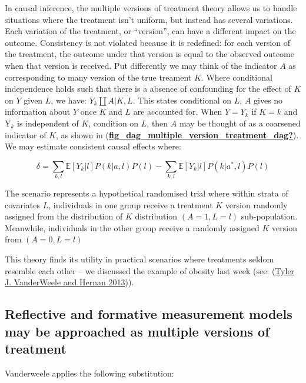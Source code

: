 \documentclass[
  singlecolumn]{report}
\begin{document}
In causal inference, the multiple versions of treatment theory allows us
to handle situations where the treatment isn't uniform, but instead has
several variations. Each variation of the treatment, or ``version'', can
have a different impact on the outcome. Consistency is not violated
because it is redefined: for each version of the treatment, the outcome
under that version is equal to the observed outcome when that version is
received. Put differently we may think of the indicator \(A\) as
corresponding to many version of the true treament \(K\). Where
conditional independence holds such that there is a absence of
confounding for the effect of \(K\) on \(Y\) given \(L\), we have:
\(Y_k \coprod A|K,L\). This states conditional on \(L\), \(A\) gives no
information about \(Y\) once \(K\) and \(L\) are accounted for. When
\(Y = Y_k\) if \(K = k\) and Y\(_k\) is independent of \(K\), condition
on \(L\), then \(A\) may be thought of as a coarsened indicator of
\(K\), as shown in
(\protect\hyperlink{ref-fig_dag_multiple_version_treatment_dag}{\textbf{fig\_dag\_multiple\_version\_treatment\_dag?}}).
We may estimate consistent causal effects where:

\[ \delta = \sum_{k,l} \mathbb{E}[Y_k|l] P(k|a,l) P(l) - \sum_{k,l} \mathbb{E}[Y_k|l] P(k|a^*,l) P(l)\]

The scenario represents a hypothetical randomised trial where within
strata of covariates \(L\), individuals in one group receive a treatment
\(K\) version randomly assigned from the distribution of \(K\)
distribution \((A = 1, L = l)\) sub-population. Meanwhile, individuals
in the other group receive a randomly assigned \(K\) version from
\((A = 0, L = l)\)

This theory finds its utility in practical scenarios where treatments
seldom resemble each other -- we discussed the example of obesity last
week (see: (\protect\hyperlink{ref-vanderweele2013}{Tyler J. VanderWeele
and Hernan 2013})).

\hypertarget{reflective-and-formative-measurement-models-may-be-approached-as-multiple-versions-of-treatment}{%
\subsection{Reflective and formative measurement models may be
approached as multiple versions of
treatment}\label{reflective-and-formative-measurement-models-may-be-approached-as-multiple-versions-of-treatment}}

Vanderweele applies the following substitution:
\end{document}
